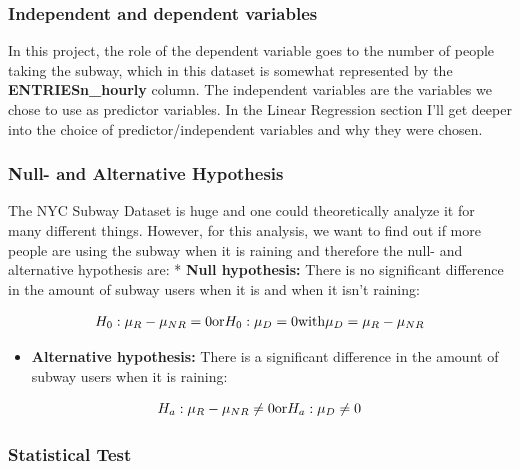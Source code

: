 \documentclass{article}
\providecommand{\tightlist}{%
      \setlength{\itemsep}{0pt}\setlength{\parskip}{0pt}}
\begin{document}
\subsubsection{Independent and dependent
variables}\label{independent-and-dependent-variables}

In this project, the role of the dependent variable goes to the number
of people taking the subway, which in this dataset is somewhat
represented by the \textbf{ENTRIESn\_hourly} column. The independent
variables are the variables we chose to use as predictor variables. In
the Linear Regression section I'll get deeper into the choice of
predictor/independent variables and why they were chosen.

\subsubsection{Null- and Alternative
Hypothesis}\label{null--and-alternative-hypothesis}

The NYC Subway Dataset is huge and one could theoretically analyze it
for many different things. However, for this analysis, we want to find
out if more people are using the subway when it is raining and therefore
the null- and alternative hypothesis are: * \textbf{Null hypothesis:}
There is no significant difference in the amount of subway users when it
is and when it isn't raining:

\[H_0: \mu_{R} - \mu_{NR} = 0 \\ \, \\ \text{or} \\ \, \\ H_0: \mu_D = 0 \\ \, \\ \text{with} \\ \, \\ \mu_D = \mu_{R} - \mu_{NR}\]

\begin{itemize}
\tightlist
\item
  \textbf{Alternative hypothesis:} There is a significant difference in
  the amount of subway users when it is raining:
\end{itemize}

\[H_a: \mu_{R} - \mu_{NR} \neq 0 \\ \, \\ \text{or} \\ \, \\ H_a: \mu_D \neq 0\]

\subsubsection{Statistical Test}\label{statistical-test}
\end{document}
